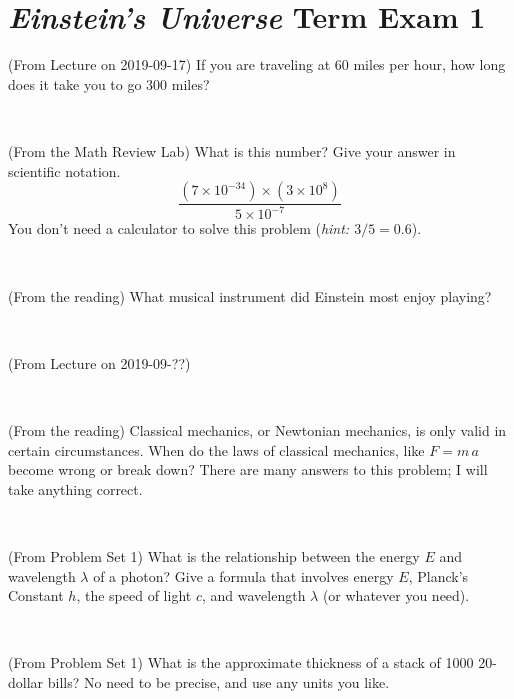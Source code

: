 \documentclass[12pt, letterpaper]{article}
\begin{document}
\section*{\textsl{Einstein's Universe} Term Exam 1}
\setcounter{problem}{1}


\begin{problem} (From Lecture on 2019-09-17)
If you are traveling at 60 miles per hour, how long does
it take you to go 300 miles?
\end{problem}


\vfill ~

\begin{problem} (From the Math Review Lab)
What is this number? Give your answer in scientific notation.
$$
\frac{(7\times10^{-34})\times(3\times10^8)}{5\times10^{-7}}
$$
You don't need a calculator to solve this problem (\textit{hint: $3/5=0.6$}).
\end{problem}


\vfill ~

\begin{problem} (From the reading)
What musical instrument did Einstein most enjoy playing?
\end{problem}


\vfill ~

\begin{problem} (From Lecture on 2019-09-??)
\end{problem}


\vfill ~


\clearpage


\begin{problem} (From the reading)
Classical mechanics, or Newtonian mechanics, is only valid in certain
circumstances. When do the laws of classical mechanics, like $F =
m\,a$ become wrong or break down? There are many answers to this
problem; I will take anything correct.
\end{problem}


\vfill ~

\begin{problem} (From Problem Set 1)
What is the relationship between the energy $E$ and wavelength
$\lambda$ of a photon? Give a formula that involves energy $E$,
Planck's Constant $h$, the speed of light $c$, and wavelength
$\lambda$ (or whatever you need).
\end{problem}

\vfill ~

\begin{problem} (From Problem Set 1)
What is the approximate thickness of a stack of 1000 20-dollar bills?
No need to be precise, and use any units you like.
\end{problem}
\end{document}
